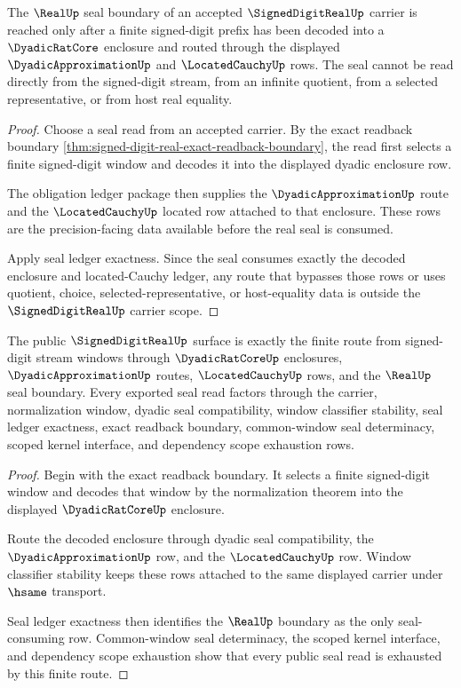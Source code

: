 \begin{theorem}
\label{thm:signed-digit-real-real-seal-scope-boundary}
The $\RealUp$ seal boundary of an accepted $\SignedDigitRealUp$ carrier is reached only after a finite signed-digit prefix has been decoded into a $\DyadicRatCore$ enclosure and routed through the displayed $\DyadicApproximationUp$ and $\LocatedCauchyUp$ rows. The seal cannot be read directly from the signed-digit stream, from an infinite quotient, from a selected representative, or from host real equality.
\end{theorem}
\begin{proof}
Choose a seal read from an accepted carrier. By the exact readback boundary \autoref{thm:signed-digit-real-exact-readback-boundary}, the read first selects a finite signed-digit window and decodes it into the displayed dyadic enclosure row.

The obligation ledger package then supplies the $\DyadicApproximationUp$ route and the $\LocatedCauchyUp$ located row attached to that enclosure. These rows are the precision-facing data available before the real seal is consumed.

Apply seal ledger exactness. Since the seal consumes exactly the decoded enclosure and located-Cauchy ledger, any route that bypasses those rows or uses quotient, choice, selected-representative, or host-equality data is outside the $\SignedDigitRealUp$ carrier scope.
\end{proof}

\begin{theorem}
\label{thm:signed-digit-real-public-seal-export}
The public $\SignedDigitRealUp$ surface is exactly the finite route from signed-digit stream windows through $\DyadicRatCoreUp$ enclosures, $\DyadicApproximationUp$ routes, $\LocatedCauchyUp$ rows, and the $\RealUp$ seal boundary. Every exported seal read factors through the carrier, normalization window, dyadic seal compatibility, window classifier stability, seal ledger exactness, exact readback boundary, common-window seal determinacy, scoped kernel interface, and dependency scope exhaustion rows.
\end{theorem}
\begin{proof}
Begin with the exact readback boundary. It selects a finite signed-digit window and decodes that window by the normalization theorem into the displayed $\DyadicRatCoreUp$ enclosure.

Route the decoded enclosure through dyadic seal compatibility, the $\DyadicApproximationUp$ row, and the $\LocatedCauchyUp$ row. Window classifier stability keeps these rows attached to the same displayed carrier under $\hsame$ transport.

Seal ledger exactness then identifies the $\RealUp$ boundary as the only seal-consuming row. Common-window seal determinacy, the scoped kernel interface, and dependency scope exhaustion show that every public seal read is exhausted by this finite route.
\end{proof}

